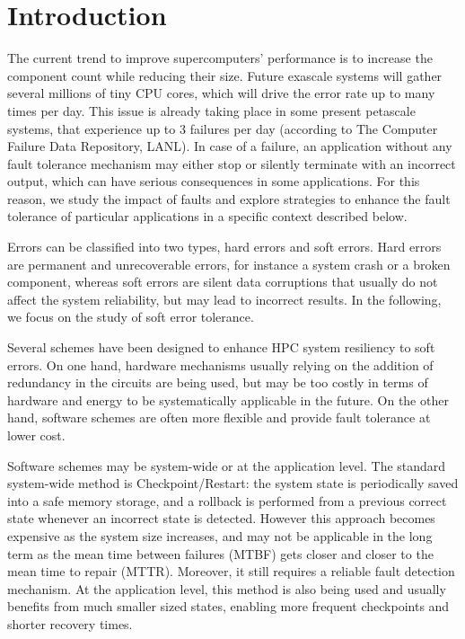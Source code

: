 \documentclass[twoside]{article}
\begin{document}
\makeRR   %

\tableofcontents

\newcommand{\allOne}{\bf{1}}

\section{Introduction}
The current trend to improve supercomputers' performance is to increase the component count while reducing their size. Future exascale systems will gather several millions of tiny CPU cores, which will drive the error rate up to many times per day. This issue is already taking place in some present petascale systems, that experience up to 3 failures per day (according to The Computer Failure Data Repository\cite{CFDR}, LANL). In case of a failure, an application without any fault tolerance mechanism may either stop or silently terminate with an incorrect output, which can have serious consequences in some applications. For this reason, we study the impact of faults and explore strategies to enhance the fault tolerance of particular applications in a specific context described below. 

Errors can be classified into two types, hard errors and soft errors. Hard errors are permanent and unrecoverable errors, for instance a system crash or a broken component, whereas soft errors are silent data corruptions that usually do not affect the system reliability, but may lead to incorrect results. In the following, we focus on the study of soft error tolerance.

Several schemes have been designed to enhance HPC system resiliency to soft errors. On one hand, hardware mechanisms usually relying on the addition of redundancy in the circuits are being used, but may be too costly in terms of hardware and energy to be systematically applicable in the future. On the other hand, software schemes are often more flexible and provide fault tolerance at lower cost.

Software schemes may be system-wide or at the application level. The standard system-wide method is Checkpoint/Restart: the system state is periodically saved into a safe memory storage, and a rollback is performed from a previous correct state whenever an incorrect state is detected. However this approach becomes expensive as the system size increases,  and may not be applicable in the long term as the mean time between failures (MTBF) gets closer and closer to the mean time to repair (MTTR). Moreover, it still requires a reliable fault detection mechanism. At the application level, this method is also being used and usually benefits from much smaller sized states, enabling more frequent checkpoints and shorter recovery times.
\end{document}
